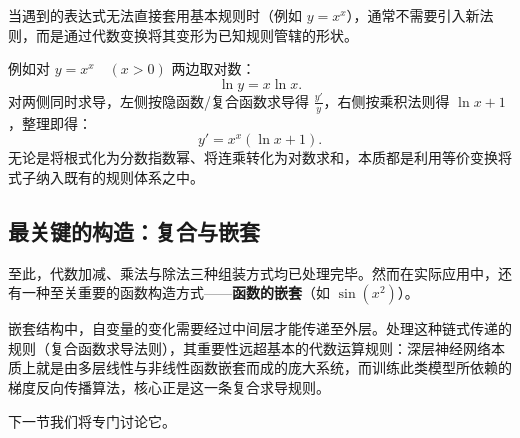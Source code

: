 当遇到的表达式无法直接套用基本规则时（例如 \(y=x^x\)），通常不需要引入新法则，而是通过代数变换将其变形为已知规则管辖的形状。

例如对 \(y=x^x\quad (x>0)\) 两边取对数：
\[
\ln y = x\ln x.
\]
对两侧同时求导，左侧按隐函数/复合函数求导得 \(\frac{y'}{y}\)，右侧按乘积法则得 \(\ln x+1\)，整理即得：
\[
y' = x^x(\ln x+1).
\]
无论是将根式化为分数指数幂、将连乘转化为对数求和，本质都是利用等价变换将式子纳入既有的规则体系之中。

\subsection{最关键的构造：复合与嵌套}

至此，代数加减、乘法与除法三种组装方式均已处理完毕。然而在实际应用中，还有一种至关重要的函数构造方式——\textbf{函数的嵌套}（如 \(\sin(x^2)\)）。

嵌套结构中，自变量的变化需要经过中间层才能传递至外层。处理这种链式传递的规则（复合函数求导法则），其重要性远超基本的代数运算规则：深层神经网络本质上就是由多层线性与非线性函数嵌套而成的庞大系统，而训练此类模型所依赖的梯度反向传播算法，核心正是这一条复合求导规则。

下一节我们将专门讨论它。